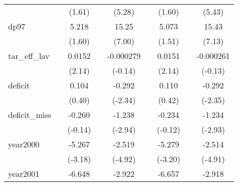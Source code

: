 {\begin{tabular}{l*{8}{c}}
            &                     &      (1.61)         &                     &      (5.28)         &                     &      (1.60)         &                     &      (5.43)         \\
[1em]
dp97        &                     &       5.218         &                     &       15.25\sym{***}&                     &       5.073         &                     &       15.43\sym{***}\\
            &                     &      (1.60)         &                     &      (7.00)         &                     &      (1.51)         &                     &      (7.13)         \\
[1em]
tar\_eff\_lav &                     &      0.0152\sym{*}  &                     &   -0.000279         &                     &      0.0151\sym{*}  &                     &   -0.000261         \\
            &                     &      (2.14)         &                     &     (-0.14)         &                     &      (2.14)         &                     &     (-0.13)         \\
[1em]
deficit     &                     &       0.104         &                     &      -0.292\sym{*}  &                     &       0.110         &                     &      -0.292\sym{*}  \\
            &                     &      (0.40)         &                     &     (-2.34)         &                     &      (0.42)         &                     &     (-2.35)         \\
[1em]
deficit\_miss&                     &      -0.260         &                     &      -1.238\sym{**} &                     &      -0.234         &                     &      -1.234\sym{**} \\
            &                     &     (-0.14)         &                     &     (-2.94)         &                     &     (-0.12)         &                     &     (-2.93)         \\
[1em]
year2000    &                     &      -5.267\sym{**} &                     &      -2.519\sym{***}&                     &      -5.279\sym{**} &                     &      -2.514\sym{***}\\
            &                     &     (-3.18)         &                     &     (-4.92)         &                     &     (-3.20)         &                     &     (-4.91)         \\
[1em]
year2001    &                     &      -6.648\sym{***}&                     &      -2.922\sym{***}&                     &      -6.657\sym{***}&                     &      -2.918\sym{***}\\

\end{tabular}}
